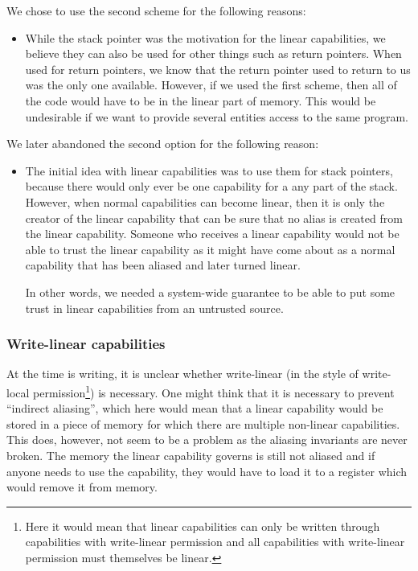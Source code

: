 \documentclass[a3paper]{article}
\begin{document}
We chose to use the second scheme for the following reasons:
\begin{itemize}
\item While the stack pointer was the motivation for the linear capabilities, we believe they can also be used for other things such as return pointers. When used for return pointers, we know that the return pointer used to return to us was the only one available. However, if we used the first scheme, then all of the code would have to be in the linear part of memory. This would be undesirable if we want to provide several entities access to the same program. 
\end{itemize}
We later abandoned the second option for the following reason:
\begin{itemize}
\item The initial idea with linear capabilities was to use them for stack pointers, because there would only ever be one capability for a any part of the stack. However, when normal capabilities can become linear, then it is only the creator of the linear capability that can be sure that no alias is created from the linear capability. Someone who receives a linear capability would not be able to trust the linear capability as it might have come about as a normal capability that has been aliased and later turned linear.

In other words, we needed a system-wide guarantee to be able to put some trust in linear capabilities from an untrusted source.
\end{itemize}

\subsubsection{Write-linear capabilities}

At the time is writing, it is unclear whether write-linear (in the style of write-local permission\footnote{Here it would mean that linear capabilities can only be written through capabilities with write-linear permission and all capabilities with write-linear permission must themselves be linear.}) is necessary. One might think that it is necessary to prevent ``indirect aliasing'', which here would mean that a linear capability would be stored in a piece of memory for which there are multiple non-linear capabilities. This does, however, not seem to be a problem as the aliasing invariants are never broken. The memory the linear capability governs is still not aliased and if anyone needs to use the capability, they would have to load it to a register which would remove it from memory.
\end{document}

